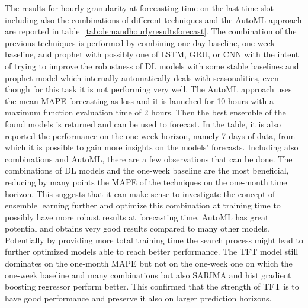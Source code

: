 The results for hourly granularity at forecasting time on the last time slot including also the combinations of different techniques and the AutoML approach are reported in table~\ref{tab:demandhourlyresultsforecast}.
The combination of the previous techniques is performed by combining one-day baseline, one-week baseline, and prophet with possibly one of LSTM, GRU, or CNN with the intent of trying to improve the robustness of DL models with some stable baselines and prophet model which internally automatically deals with seasonalities, even though for this task it is not performing very well.
The AutoML approach uses the mean MAPE forecasting as loss and it is launched for 10 hours with a maximum function evaluation time of 2 hours.
Then the best ensemble of the found models is returned and can be used to forecast.
In the table, it is also reported the performance on the one-week horizon, namely 7 days of data, from which it is possible to gain more insights on the models' forecasts.
Including also combinations and AutoML, there are a few observations that can be done.
The combinations of DL models and the one-week baseline are the most beneficial, reducing by many points the MAPE of the techniques on the one-month time horizon.
This suggests that it can make sense to investigate the concept of ensemble learning further and optimize this combination at training time to possibly have more robust results at forecasting time.
AutoML has great potential and obtains very good results compared to many other models.
Potentially by providing more total training time the search process might lead to further optimized models able to reach better performance.
The TFT model still dominates on the one-month MAPE but not on the one-week one on which the one-week baseline and many combinations but also SARIMA and hist gradient boosting regressor perform better.
This confirmed that the strength of TFT is to have good performance and preserve it also on larger prediction horizons.

